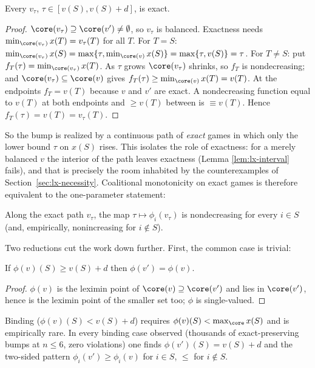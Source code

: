 \begin{lemma}\label{lem:lx-interval}
Every $v_\tau$, $\tau\in[v(S),v(S)+d]$, is exact.
\end{lemma}

\begin{proof}
$\core(v_\tau)\supseteq\core(v')\neq\emptyset$, so $v_\tau$ is balanced.
Exactness needs $\min_{\core(v_\tau)}x(T)=v_\tau(T)$ for all $T$.
For $T=S$: $\min_{\core(v_\tau)}x(S)=\max\{\tau,\min_{\core(v)}x(S)\}
=\max\{\tau,v(S)\}=\tau$.
For $T\neq S$: put $f_T(\tau)=\min_{\core(v_\tau)}x(T)$. As $\tau$ grows
$\core(v_\tau)$ shrinks, so $f_T$ is nondecreasing; and $\core(v_\tau)\subseteq
\core(v)$ gives $f_T(\tau)\ge\min_{\core(v)}x(T)=v(T)$. At the endpoints
$f_T=v(T)$ because $v$ and $v'$ are exact. A nondecreasing function equal to
$v(T)$ at both endpoints and $\ge v(T)$ between is $\equiv v(T)$. Hence
$f_T(\tau)=v(T)=v_\tau(T)$.
\end{proof}

So the bump is realized by a continuous path of \emph{exact} games in which only
the lower bound $\tau$ on $x(S)$ rises. This isolates the role of exactness: for a
merely balanced $v$ the interior of the path leaves exactness (Lemma
\ref{lem:lx-interval} fails), and that is precisely the room inhabited by the
counterexamples of Section~\ref{sec:lx-necessity}. Coalitional monotonicity on
exact games is therefore equivalent to the one-parameter statement:

\begin{lemma}\label{lem:lx-C}
Along the exact path $v_\tau$, the map $\tau\mapsto\phi_i(v_\tau)$ is nondecreasing
for every $i\in S$ (and, empirically, nonincreasing for $i\notin S$).
\end{lemma}

Two reductions cut the work down further. First, the common case is trivial:

\begin{lemma}\label{lem:lx-nonbinding}
If $\phi(v)(S)\ge v(S)+d$ then $\phi(v')=\phi(v)$.
\end{lemma}
\begin{proof}
$\phi(v)$ is the leximin point of $\core(v)\supseteq\core(v')$ and lies in
$\core(v')$, hence is the leximin point of the smaller set too; $\phi$ is
single-valued.
\end{proof}

\noindent Binding ($\phi(v)(S)<v(S)+d$) requires $\phi(v)(S)<\max_{\core}x(S)$ and
is empirically rare. In every binding case observed (thousands of exact-preserving
bumps at $n\le6$, zero violations) one finds $\phi(v')(S)=v(S)+d$ and the two-sided
pattern $\phi_i(v')\ge\phi_i(v)$ for $i\in S$, $\le$ for $i\notin S$.

